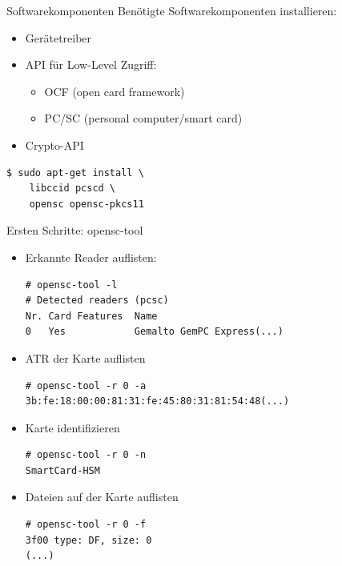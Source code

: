 \documentclass{beamer}
\begin{document}
\begin{frame}[fragile]{Softwarekomponenten}
Benötigte Softwarekomponenten installieren:
\begin{itemize}
  \item Gerätetreiber
  \item API für Low-Level Zugriff:
  \begin{itemize}
    \item OCF (open card framework)
    \item PC/SC (personal computer/smart card)
  \end{itemize}
  \item Crypto-API
\end{itemize}

\begin{lstlisting}
$ sudo apt-get install \
    libccid pcscd \
    opensc opensc-pkcs11
\end{lstlisting}
\end{frame}

\begin{frame}[fragile]{Ersten Schritte: opensc-tool}
\begin{minipage}[t][\textheight][t]{\linewidth}
\begin{itemize}
  \item Erkannte Reader auflisten: 
  \begin{lstlisting}
# opensc-tool -l
# Detected readers (pcsc)
Nr. Card Features  Name
0   Yes            Gemalto GemPC Express(...)
  \end{lstlisting}
  \item ATR der Karte auflisten
  \begin{lstlisting}
# opensc-tool -r 0 -a
3b:fe:18:00:00:81:31:fe:45:80:31:81:54:48(...)  
  \end{lstlisting}
  \item Karte identifizieren
  \begin{lstlisting}
# opensc-tool -r 0 -n
SmartCard-HSM
  \end{lstlisting}
  \item Dateien auf der Karte auflisten
  \begin{lstlisting}
# opensc-tool -r 0 -f
3f00 type: DF, size: 0
(...)
  \end{lstlisting}
\end{itemize}
\end{minipage}
\end{frame}
\end{document}
